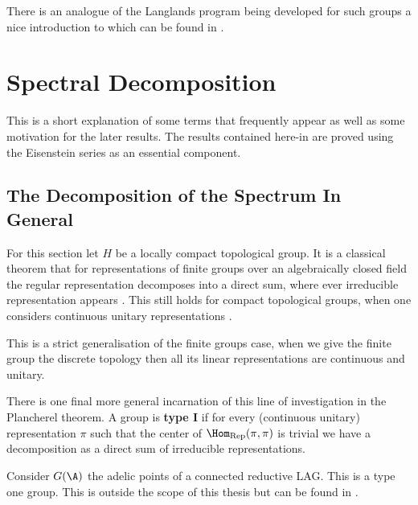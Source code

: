 There is an analogue of the Langlands program being developed for such groups a nice introduction to which can be found in \cite{ganLgroupsLanglandsProgram2017}. 








\section{Spectral Decomposition}\label{spectral_decomposition}
This is a short explanation of some terms that frequently appear as well as some motivation for the later results. The results contained here-in are proved using the Eisenstein series as an essential component. 

\subsection{The Decomposition of the Spectrum In General}\label{direct_integral}
For this section let \(H\) be a locally compact topological group.
It is a classical theorem that for representations of finite groups over an algebraically closed field the regular representation decomposes into a direct sum, where ever irreducible representation appears \cite[Ch. 2.4 Cor. 2 ]{LinearRepresentationsFinite}. This still holds for compact topological groups, when one considers continuous unitary representations \cite[5.1]{follandCourseAbstractHarmonic2016}.
\begin{remark}
    This is a strict generalisation of the finite groups case, when we give the finite group the discrete topology then all its linear representations are continuous and unitary.
\end{remark}
There is one final more general incarnation of this line of investigation in the Plancherel theorem. A group is \textbf{type I} if for every (continuous unitary) representation \(\pi\) such that the center of \(\Hom_\mathrm{Rep}(\pi, \pi)\) is trivial we have a decomposition as a  direct sum of irreducible representations. 

\begin{example}
    Consider \(G(\A)\) the adelic points of a connected reductive LAG. This is a type one group. This is outside the scope of this thesis but can be found in \cite[Thm. 1.7 + Thm. 2.3]{deitmarTraceClassGroups2017}.
\end{example}

